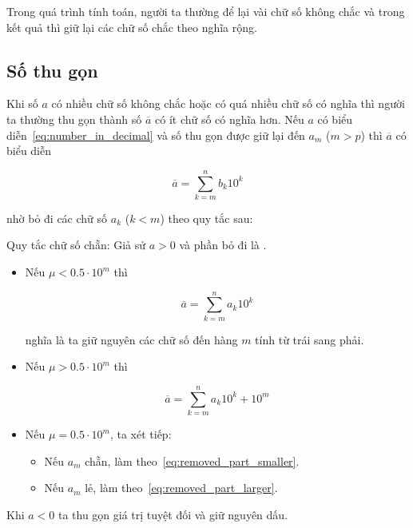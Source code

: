 \documentclass[../../Lectures.tex]{subfiles}
\begin{document}
Trong quá trình tính toán, người ta thường để lại vài chữ số không chắc và trong
kết quả thì giữ lại các chữ số chắc theo nghĩa rộng.

\subsection{Số thu gọn}

Khi số \(a\) có nhiều chữ số không chắc hoặc có quá nhiều chữ số có nghĩa thì
người ta thường thu gọn thành số \(\overline{a}\) có ít chữ số có nghĩa hơn. Nếu
\(a\) có biểu diễn~\ref{eq:number_in_decimal} và số thu gọn được giữ lại đến
\(a_m\) (\(m > p\)) thì \(\overline{a}\) có biểu diễn

\begin{equation}
    \overline{a} = \sum_{k=m}^{n} b_k 10^k
\end{equation}

nhờ bỏ đi các chữ số \(a_k\) (\(k < m\)) theo quy tắc sau:

\begin{rule_of_thumb}
Quy tắc chữ số chẵn: Giả sử \(a > 0\) và phần bỏ đi là \mu.

\begin{itemize}
    \item Nếu \(\mu < \num{0.5} \cdot 10^m\) thì

        \begin{equation}\label{eq:removed_part_smaller}
            \overline{a} = \sum_{k=m}^{n} a_k 10^k
        \end{equation}

        nghĩa là ta giữ nguyên các chữ số đến hàng \(m\) tính từ trái sang phải.

    \item Nếu \(\mu > \num{0.5} \cdot 10^m\) thì

        \begin{equation}\label{eq:removed_part_larger}
            \overline{a} = \sum_{k=m}^{n} a_k 10^k + 10^m
        \end{equation}

    \item Nếu \(\mu = \num{0.5} \cdot 10^m\), ta xét tiếp:

        \begin{itemize}
            \item Nếu \(a_m\) chẵn, làm theo~\ref{eq:removed_part_smaller}.
            \item Nếu \(a_m\) lẻ, làm theo~\ref{eq:removed_part_larger}.
        \end{itemize}
\end{itemize}

Khi \(a < 0\) ta thu gọn giá trị tuyệt đối và giữ nguyên dấu.
\end{rule_of_thumb}
\end{document}

